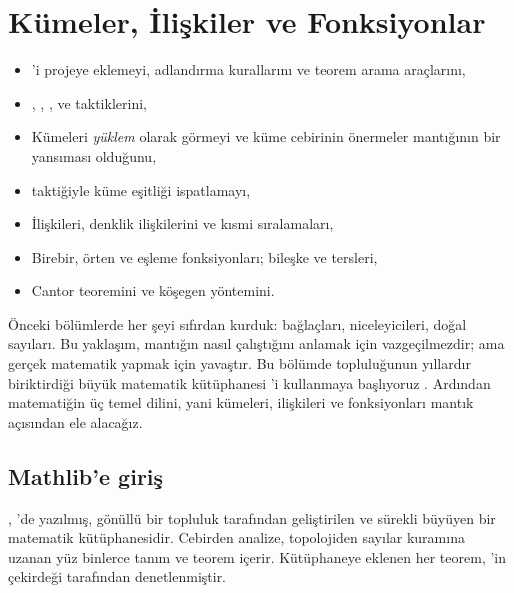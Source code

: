 \chapter{Kümeler, İlişkiler ve Fonksiyonlar}\label{bol:kumeler}

\begin{bolumhedefleri}
\begin{itemize}
  \item \Mathlib{}'i projeye eklemeyi, adlandırma kurallarını ve teorem
        arama araçlarını,
  \item {}, , ,
         ve  taktiklerini,
  \item Kümeleri \emph{yüklem} olarak görmeyi ve küme cebirinin
        önermeler mantığının bir yansıması olduğunu,
  \item {} taktiğiyle küme eşitliği ispatlamayı,
  \item İlişkileri, denklik ilişkilerini ve kısmi sıralamaları,
  \item Birebir, örten ve eşleme fonksiyonları; bileşke ve tersleri,
  \item Cantor teoremini ve köşegen yöntemini.
\end{itemize}
\end{bolumhedefleri}

Önceki bölümlerde her şeyi sıfırdan kurduk: bağlaçları, niceleyicileri,
doğal sayıları. Bu yaklaşım, mantığın nasıl çalıştığını anlamak için
vazgeçilmezdir; ama gerçek matematik yapmak için yavaştır. Bu bölümde
\Lean{} topluluğunun yıllardır biriktirdiği büyük matematik kütüphanesi
\Mathlib{}'i kullanmaya başlıyoruz \citep{mathlib2020}. Ardından
matematiğin üç temel dilini, yani kümeleri, ilişkileri ve fonksiyonları
mantık açısından ele alacağız.

\section{Mathlib'e giriş}\label{sec:mathlib}

\Mathlib{}, \Lean{}'de yazılmış, gönüllü bir topluluk tarafından
geliştirilen ve sürekli büyüyen bir matematik kütüphanesidir. Cebirden
analize, topolojiden sayılar kuramına uzanan yüz binlerce tanım ve
teorem içerir. Kütüphaneye eklenen her teorem, \Lean{}'in çekirdeği
tarafından denetlenmiştir.

